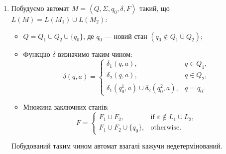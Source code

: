 \begin{enumerate}
	\item Побудуємо автомат $M = \left\langle Q, \Sigma, q_0, \delta, F \right\rangle$ такий, що $L(M) = L(M_1) \cup L(M_2)$:
	\begin{itemize}
		\item $Q = Q_1 \cup Q_2 \cup \{q_0\}$, де $q_0$ --- новий стан $(q_0 \notin Q_1 \cup Q_2)$;
		\item Функцію $\delta$ визначимо таким чином:
		\begin{equation}
			\delta(q, a) = \begin{cases}
				\delta_1(q, a), & q \in Q_1, \\
				\delta_2(q, a), & q \in Q_2, \\
				\delta_1(q_0^1, a) \cup \delta_2(q_0^2, a), & q = q_0. 
			\end{cases}
		\end{equation}
		\item Множина заключних станів:
		\begin{equation}
			F = \begin{cases}
				F_1 \cup F_2, & \text{if } \varepsilon \notin L_1 \cup L_2, \\
				F_1 \cup F_2 \cup \{q_0\}, & \text{otherwise}.
			\end{cases}		
		\end{equation}	
	\end{itemize}
	
	Побудований таким чином автомат взагалі кажучи недетермінований. \medskip


\end{enumerate}
